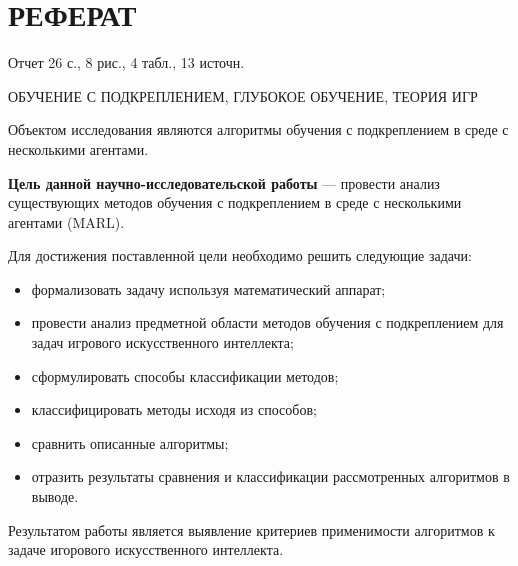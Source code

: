 \section*{\large РЕФЕРАТ}

Отчет 26 с., 8 рис., 4 табл., 13 источн. 

ОБУЧЕНИЕ С ПОДКРЕПЛЕНИЕМ, ГЛУБОКОЕ ОБУЧЕНИЕ, ТЕОРИЯ ИГР

Объектом исследования являются алгоритмы обучения с подкреплением в среде с несколькими агентами. 

\textbf{Цель данной научно-исследовательской работы} --- провести анализ существующих методов обучения с подкреплением в среде с несколькими агентами (MARL).

Для достижения поставленной цели необходимо решить следующие задачи:
\begin{itemize}[label=---]
	\item формализовать задачу используя математический аппарат;
	\item провести анализ предметной области методов обучения с подкреплением для задач игрового искусственного интеллекта;
	\item сформулировать способы классификации методов;
	\item классифицировать методы исходя из способов;
	\item сравнить описанные алгоритмы;
	\item отразить результаты сравнения и классификации рассмотренных алгоритмов в выводе.
\end{itemize}

Результатом работы является выявление критериев применимости алгоритмов к задаче игорового искусственного интеллекта.

